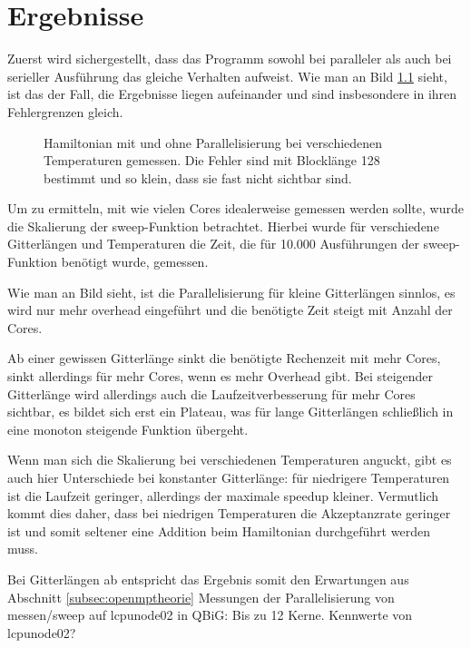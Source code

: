 	\chapter{Ergebnisse}
	\label{chap:ergebnisse}
	
	Zuerst wird sichergestellt, dass das Programm sowohl bei paralleler als auch bei serieller Ausführung das gleiche Verhalten aufweist. Wie man an Bild \ref{fig:vergleichham} sieht, ist das der Fall, die Ergebnisse liegen aufeinander und sind insbesondere in ihren Fehlergrenzen gleich.
	
	\begin{figure}[htbp]
		
		\caption[Hamiltonian mit und ohne Parallelisierung]{Hamiltonian mit und ohne Parallelisierung bei verschiedenen Temperaturen gemessen. Die Fehler sind mit Blocklänge 128 bestimmt und so klein, dass sie fast nicht sichtbar sind.}
		\label{fig:vergleichham}
	\end{figure}
	
	Um zu ermitteln, mit wie vielen Cores idealerweise gemessen werden sollte, wurde die Skalierung der sweep-Funktion betrachtet. Hierbei wurde für verschiedene Gitterlängen und Temperaturen die Zeit, die für 10.000 Ausführungen der sweep-Funktion benötigt wurde, gemessen. 
	
	Wie man an Bild sieht, ist die Parallelisierung für kleine Gitterlängen sinnlos, es wird nur mehr overhead eingeführt und die benötigte Zeit steigt mit Anzahl der Cores.
	
	Ab einer gewissen Gitterlänge sinkt die benötigte Rechenzeit mit mehr Cores, sinkt allerdings für mehr Cores, wenn es mehr Overhead gibt. Bei steigender Gitterlänge wird allerdings auch die Laufzeitverbesserung für mehr Cores sichtbar, es bildet sich erst ein Plateau, was für lange Gitterlängen schließlich in eine monoton steigende Funktion übergeht.
	
	Wenn man sich die Skalierung bei verschiedenen Temperaturen anguckt, gibt es auch hier Unterschiede bei konstanter Gitterlänge: für niedrigere Temperaturen ist die Laufzeit geringer, allerdings der maximale speedup kleiner. Vermutlich kommt dies daher, dass bei niedrigen Temperaturen die Akzeptanzrate geringer ist und somit seltener eine Addition beim Hamiltonian durchgeführt werden muss.
	
	Bei Gitterlängen ab  entspricht das Ergebnis somit den Erwartungen aus Abschnitt \ref{subsec:openmptheorie}
	Messungen der Parallelisierung von messen/sweep auf lcpunode02 in QBiG: Bis zu 12 Kerne. Kennwerte von lcpunode02?
	
